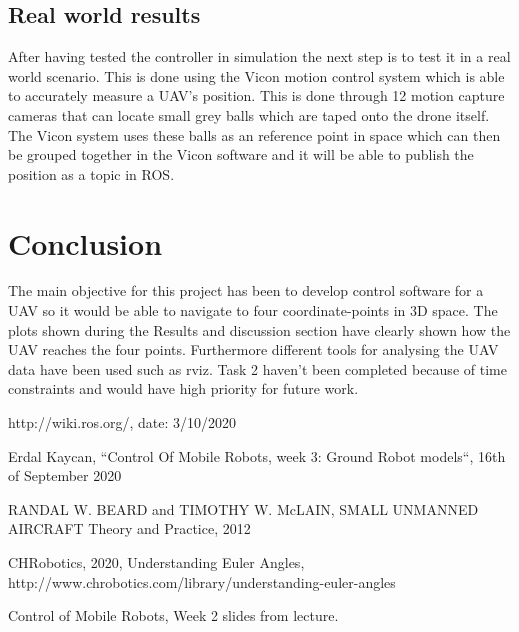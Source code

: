 \documentclass[conference]{IEEEtran}
\begin{document}
\subsection{Real world results}
After having tested the controller in simulation the next step is to test it in a real world scenario. This is done using the Vicon motion control system which is able to accurately measure a UAV's position. This is done through 12 motion capture cameras that can locate small grey balls which are taped onto the drone itself. The Vicon system uses these balls as an reference point in space which can then be grouped together in the Vicon software and it will be able to publish the position as a topic in ROS.

\section{Conclusion}
The main objective for this project has been to develop control software for a UAV so it would be able to navigate to four coordinate-points in 3D space. The plots shown during the Results and discussion section have clearly shown how the UAV reaches the four points. Furthermore different tools for analysing the UAV data have been used such as rviz. Task 2 haven't been completed because of time constraints and would have high priority for future work.

\begin{thebibliography}{00}

 http://wiki.ros.org/, date: 3/10/2020

 Erdal Kaycan, ``Control Of Mobile Robots, week 3: Ground Robot models``, 16th of September 2020

 RANDAL W. BEARD and TIMOTHY W. McLAIN, SMALL UNMANNED AIRCRAFT Theory and Practice, 2012

 CHRobotics, 2020, Understanding Euler Angles, http://www.chrobotics.com/library/understanding-euler-angles

 Control of Mobile Robots, Week 2 slides from lecture.

\end{thebibliography}
\vspace{12pt}
\end{document}
